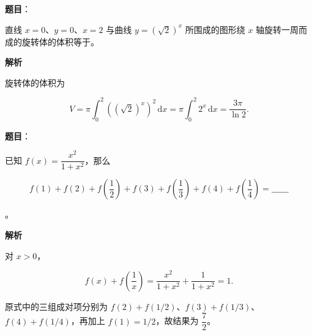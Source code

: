 \begin{answer}

\textbf{题目}：

直线 $x=0\text{、}y=0\text{、}x=2$ 与曲线 $y=(\sqrt2)^x$ 所围成的图形绕 $x$ 轴旋转一周而成的旋转体的体积等于\gkblank{}。

\textbf{解析}

旋转体的体积为

\nopagebreak[4]
\[
V=\pi\int_0^2\left((\sqrt2)^x\right)^2\,\mathrm dx
=\pi\int_0^2 2^x\,\mathrm dx
=\frac{3\pi}{\ln2}.
\]


\end{answer}
\begin{answer}

\textbf{题目}：

已知 $f(x)=\dfrac{x^2}{1+x^2}$，那么

\nopagebreak[4]
\[
f(1)+f(2)+f\left(\frac12\right)+f(3)+f\left(\frac13\right)+f(4)+f\left(\frac14\right)=\_\_\_\_\_\_
\]

。

\textbf{解析}

对 $x>0$，

\nopagebreak[4]
\[
f(x)+f\left(\frac1x\right)
=\frac{x^2}{1+x^2}+\frac1{1+x^2}=1.
\]

原式中的三组成对项分别为 $f(2)+f(1/2)$、$f(3)+f(1/3)$、$f(4)+f(1/4)$，再加上 $f(1)=1/2$，故结果为 $\dfrac72$。


\end{answer}

